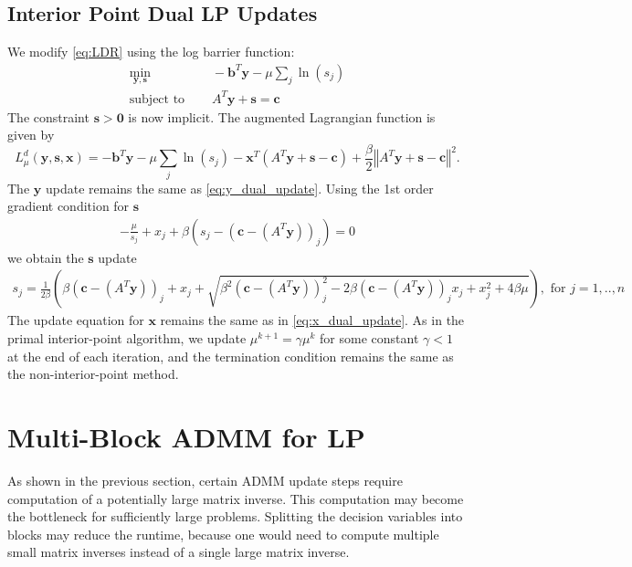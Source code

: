\documentclass{article}
\begin{document}
\subsection*{Interior Point Dual LP Updates}
We modify \eqref{eq:LDR} using the log barrier function:
\begin{align}
\min_{\mathbf{y}, \mathbf{s}} &\quad -\mathbf{b}^T\mathbf{y} - \mu \sum_j \ln (s_j)  \tag{LDRB}\label{LDRB} \\
\text{subject to } &\quad  A^T \mathbf{y}  + \mathbf{s} = \mathbf{c}  \nonumber
\end{align}
The constraint $\mathbf{s} > \mathbf{0}$ is now implicit. The augmented Lagrangian function is given by
\[
L_{\mu}^{d}(\mathbf{y},\mathbf{s},\mathbf{x})=-\mathbf{b}^{T}\mathbf{y}-\mu\sum_{j}\ln\left(s_{j}\right)-\mathbf{x}^{T}\left(A^{T}\mathbf{y}+\mathbf{s}-\mathbf{c}\right)+\frac{\beta}{2}\left\Vert A^{T}\mathbf{y}+\mathbf{s}-\mathbf{c}\right\Vert ^{2}.
\]
The $\mathbf{y}$ update remains the same as \eqref{eq:y_dual_update}. Using the 1st order gradient condition for $\mathbf{s}$
\begin{align}
- \frac{\mu}{s_j} + x_j  + \beta \left(s_j - (\mathbf{c} - (A^T \mathbf{y}))_j\right)= 0
\end{align}
we obtain the $\mathbf{s}$ update
\begin{align}
s_j = \frac{1}{2\beta}\left(\beta (\mathbf{c} - (A^T \mathbf{y}))_j + x_j  + \sqrt{\beta^2 (\mathbf{c} - (A^T \mathbf{y}))_j^2 - 2\beta (\mathbf{c} - (A^T \mathbf{y}))_j x_{j} + x_j^2 + 4\beta\mu } \right), \text{ for $j = 1,..,n$}
\end{align}
The update equation for $\mathbf{x}$ remains the same as in \eqref{eq:x_dual_update}. As in the primal interior-point algorithm, we update $\mu^{k+1} = \gamma \mu^k$ for some constant $\gamma<1$ at the end of each iteration, and the termination condition remains the same as the non-interior-point method.

\section{Multi-Block ADMM for LP}

As shown in the previous section, certain ADMM update steps require computation of a potentially large matrix inverse. This computation may become the bottleneck for sufficiently large problems. Splitting the decision variables into blocks may reduce the runtime, because one would need to compute multiple small matrix inverses instead of a single large matrix inverse.
\end{document}
